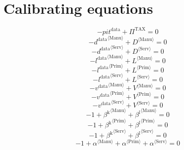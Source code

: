\section{Calibrating equations}

\begin{equation}
-{p\!i\!t}^{\mathrm{data}} + \Pi^{\mathrm{TAX}} = 0
\end{equation}
\begin{equation}
-{d^{\mathrm{data}}}^{\langle \mathrm{\mathrm{Manu}}\rangle} + {D}^{\langle \mathrm{Manu}\rangle} = 0
\end{equation}
\begin{equation}
-{d^{\mathrm{data}}}^{\langle \mathrm{\mathrm{Serv}}\rangle} + {D}^{\langle \mathrm{Serv}\rangle} = 0
\end{equation}
\begin{equation}
-{l^{\mathrm{data}}}^{\langle \mathrm{\mathrm{Manu}}\rangle} + {L}^{\langle \mathrm{Manu}\rangle} = 0
\end{equation}
\begin{equation}
-{l^{\mathrm{data}}}^{\langle \mathrm{\mathrm{Prim}}\rangle} + {L}^{\langle \mathrm{Prim}\rangle} = 0
\end{equation}
\begin{equation}
-{l^{\mathrm{data}}}^{\langle \mathrm{\mathrm{Serv}}\rangle} + {L}^{\langle \mathrm{Serv}\rangle} = 0
\end{equation}
\begin{equation}
-{v^{\mathrm{data}}}^{\langle \mathrm{\mathrm{Manu}}\rangle} + {V}^{\langle \mathrm{Manu}\rangle} = 0
\end{equation}
\begin{equation}
-{v^{\mathrm{data}}}^{\langle \mathrm{\mathrm{Prim}}\rangle} + {V}^{\langle \mathrm{Prim}\rangle} = 0
\end{equation}
\begin{equation}
-{v^{\mathrm{data}}}^{\langle \mathrm{\mathrm{Serv}}\rangle} + {V}^{\langle \mathrm{Serv}\rangle} = 0
\end{equation}
\begin{equation}
-1 + {\beta^{\mathrm{k}}}^{\langle \mathrm{\mathrm{Manu}}\rangle} + {\beta^{\mathrm{l}}}^{\langle \mathrm{\mathrm{Manu}}\rangle} = 0
\end{equation}
\begin{equation}
-1 + {\beta^{\mathrm{k}}}^{\langle \mathrm{\mathrm{Prim}}\rangle} + {\beta^{\mathrm{l}}}^{\langle \mathrm{\mathrm{Prim}}\rangle} = 0
\end{equation}
\begin{equation}
-1 + {\beta^{\mathrm{k}}}^{\langle \mathrm{\mathrm{Serv}}\rangle} + {\beta^{\mathrm{l}}}^{\langle \mathrm{\mathrm{Serv}}\rangle} = 0
\end{equation}
\begin{equation}
-1 + {\alpha}^{\langle \mathrm{\mathrm{Manu}}\rangle} + {\alpha}^{\langle \mathrm{\mathrm{Prim}}\rangle} + {\alpha}^{\langle \mathrm{\mathrm{Serv}}\rangle} = 0
\end{equation}





